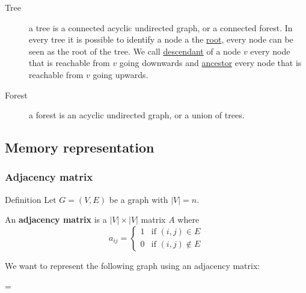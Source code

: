\documentclass[10pt]{extarticle}
\newenvironment{absolutelynopagebreak}
  {\par\nobreak\vfil\penalty0\vfilneg
   \vtop\bgroup}
  {\par\xdef\tpd{\the\prevdepth}\egroup
   \prevdepth=\tpd}
\begin{document}
\begin{description}
    \item[Tree] a tree is a connected acyclic undirected graph, or a connected forest.
        In every tree it is possible to identify a node a the \underline{root}, every node can be seen as the root of the tree.
        We call \underline{descendant} of a node $v$ every node that is reachable from $v$ going downwards and \underline{ancestor} every node that is reachable from $v$ going upwards.
    \item[Forest] a forest is an acyclic undirected graph, or a union of trees.
\end{description}

\subsection{Memory representation}

\subsubsection{Adjacency matrix}

\begin{bluebox}{Definition}
    Let $G = (V, E)$ be a graph with $|V| = n$.

    An \textbf{adjacency matrix} is a $|V| \times |V|$ matrix $A$ where
    $$
        a_{ij} = \begin{cases}
            1 & \text{if } (i, j) \in E    \\
            0 & \text{if } (i, j) \notin E
        \end{cases}
    $$
\end{bluebox}

We want to represent the following graph using an adjacency matrix:

\begin{absolutelynopagebreak}
    \begin{center}
         \label{fig:repr:graph1}
    \end{center}
\end{absolutelynopagebreak}
\end{document}
